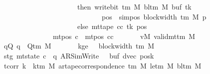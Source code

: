 \begin{isabellebody}
\ \ \ \ \ \ \ \ \ \ \ \ \ \ \ \ \ \ \ \ \ \ \ \ \ \ \ \ then\ write{\isacharunderscore}{\kern0pt}bit\ {\isacharparenleft}{\kern0pt}{\isasymGamma}{\isacharunderscore}{\kern0pt}tm\ M{\isacharparenright}{\kern0pt}\ {\isacharparenleft}{\kern0pt}bl{\isacharunderscore}{\kern0pt}tm\ M{\isacharparenright}{\kern0pt}\ {\isacharparenleft}{\kern0pt}buf\ tk{\isacharprime}{\kern0pt}{\isacharparenright}{\kern0pt}\isanewline
\ \ \ \ \ \ \ \ \ \ \ \ \ \ \ \ \ \ \ \ \ \ \ \ \ \ \ \ \ \ \ \ \ \ \ {\isacharparenleft}{\kern0pt}pos\ {\isacharminus}{\kern0pt}\ sim{\isacharunderscore}{\kern0pt}pos\ {\isacharparenleft}{\kern0pt}block{\isacharunderscore}{\kern0pt}width\ {\isacharparenleft}{\kern0pt}{\isasymGamma}{\isacharunderscore}{\kern0pt}tm\ M{\isacharparenright}{\kern0pt}{\isacharparenright}{\kern0pt}\ p{\isacharprime}{\kern0pt}{\isacharparenright}{\kern0pt}\isanewline
\ \ \ \ \ \ \ \ \ \ \ \ \ \ \ \ \ \ \ \ \ \ \ \ \ \ \ \ else\ mt{\isacharunderscore}{\kern0pt}tape\ cc\ tk{\isacharprime}{\kern0pt}\ pos{\isacharparenright}{\kern0pt}{\isacharparenright}{\kern0pt}{\isacharparenright}{\kern0pt}\isanewline
\ \ \ \ \ \ \ \ \ \ \ \ \ \ \ \ \ \ \ \ {\isasymand}\ mt{\isacharunderscore}{\kern0pt}pos\ c{\isacharprime}{\kern0pt}{\isacharprime}{\kern0pt}\ {\isacharequal}{\kern0pt}\ mt{\isacharunderscore}{\kern0pt}pos\ cc{\isachardoublequoteclose}\isanewline
\ \ \ \ \ \ \ vM{\isacharcolon}{\kern0pt}\ {\isachardoublequoteopen}valid{\isacharunderscore}{\kern0pt}mttm\ M{\isachardoublequoteclose}\isanewline
\ \ \ \ \ \ \ qQ{\isacharcolon}{\kern0pt}\ {\isachardoublequoteopen}q\ {\isasymin}\ Q{\isacharunderscore}{\kern0pt}tm\ M{\isachardoublequoteclose}\isanewline
\ \ \ \ \ \ \ kge{}{\isacharcolon}{\kern0pt}\ {\isachardoublequoteopen}{}\ {\isasymle}\ block{\isacharunderscore}{\kern0pt}width\ {\isacharparenleft}{\kern0pt}{\isasymGamma}{\isacharunderscore}{\kern0pt}tm\ M{\isacharparenright}{\kern0pt}{\isachardoublequoteclose}\isanewline
\ \ \ \ \ \ \ stg{}{\isacharcolon}{\kern0pt}\ {\isachardoublequoteopen}mt{\isacharunderscore}{\kern0pt}state\ c{}\ {\isacharequal}{\kern0pt}\ {\isacharparenleft}{\kern0pt}q{\isacharcomma}{\kern0pt}\ AR{\isacharunderscore}{\kern0pt}SimWrite{\isacharcomma}{\kern0pt}\ {}{\isacharcomma}{\kern0pt}\ {}{\isacharcomma}{\kern0pt}\ buf{\isacharcomma}{\kern0pt}\ dvec{\isacharcomma}{\kern0pt}\ posk{\isacharparenright}{\kern0pt}{\isachardoublequoteclose}\isanewline
\ \ \ \ \ \ \ tcorr{\isacharcolon}{\kern0pt}\ {\isachardoublequoteopen}{\isasymforall}k\ {\isacharless}{\kern0pt}\ k{\isacharunderscore}{\kern0pt}tm\ M{\isachardot}{\kern0pt}\ ar{\isacharunderscore}{\kern0pt}tape{\isacharunderscore}{\kern0pt}correspondence\ {\isacharparenleft}{\kern0pt}{\isasymGamma}{\isacharunderscore}{\kern0pt}tm\ M{\isacharparenright}{\kern0pt}\ {\isacharparenleft}{\kern0pt}le{\isacharunderscore}{\kern0pt}tm\ M{\isacharparenright}{\kern0pt}\ {\isacharparenleft}{\kern0pt}bl{\isacharunderscore}{\kern0pt}tm\ M{\isacharparenright}{\kern0pt}\isanewline

\end{isabellebody}
